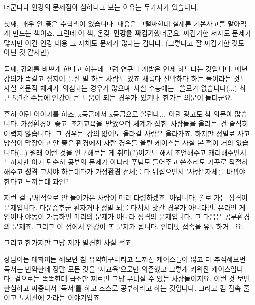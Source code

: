 더군다나 인강의 문제점이 심하다고 보는 이유는 두가지가 있습니다.
\vspace{5mm}

첫째, 매우 안 좋은 수학책이 있습니다.
내용은 그럴싸한데 실제론 기본사고를 말아먹게 만드는 책이죠.
그런데 이 책, 온갖 \textbf{인강을 짜깁기}했더군요. 짜깁기한 저자도 문제가 많지만 이건 인강 내용 그 자체도 문제가 많다는 겁니다.
(그렇다고 잘 짜깁기한 것도 아닌 것 같지만)
\vspace{5mm}

둘째, 강의를 바쁘게 한다고 하는데 그럼 연구나 개발은 언제 하느냐는 것입니다. 매년 강의가 똑같고 심지어 틀린 말 하는 사람도 있죠
새롭다 신박하다 하는 풀이라는 것도 사실 학문적 체계가 의심되는 경우가 많으며 사실 수능에는  쓸모가 없습니다(...)
최근 5년간 수능에 인강이 큰 도움이 되는 경우가 있기나 한가는 의문이 들더군요.
\vspace{5mm}

흔히 이런 이야기를 하죠. x등급에서 x등급으로 올린다... 이런 광고도 참 의문이 많습니다.
가정환경이 좋고 조기교육을 받았으며 체계가 잡힌 사람들을 올리는 건 솔직히 어렵지 않습니다. 그 경우는 강의 없어도 올라갈 사람은 올라가죠.
하지만 정말로 사고방식이 막장이고 안 좋은 환경에서 자란 경우를 올린 케이스는 사실 본 적이 거의 없습니다(...)
원래 이런 것을 연구해보는 게 취미(?)이기도 해서 조언해주고 캐리해주면서 느끼지만
이거 단순히 공부의 문제가 아니라 푸념도 들어주고 쓴소리도 거꾸로 적절히 해주고 \textbf{성격} 고쳐야 하는데다가
가정\textbf{환경} 전체를 다 뒤집으면서 '사람' 자체를 바꿔야한다고 느끼는데 과연?
\vspace{5mm}

저런 걸 구체적으로 안 들어가본 사람이 머리 타령하겠죠. 아닙니다, 뭘로 가든 성격이 문제입니다.
다운증후군 환자거나 정말 뇌를 다쳐서 맛간 경우가 아니라면, 온라인 게임이나 야동이 가능하면 머리의 문제가 아니라 성격의 문제입니다.
그 다음은 공부환경의 문제죠. 그리고 이 점에서 인강이 또 문제가 됩니다. 인터넷 접속을 유도하거든요.
\vspace{5mm}

그리고 한가지만 그냥 제가 발견한 사실 적죠.
\vspace{5mm}

상담이든 대화이든 해보면 참 유약하구나라고 느껴진 케이스들이 많고 다 추적해보면
독서는 빈약한데 정말 모든 것을 '사교육'으로만 의존했고 그렇게 키워진 케이스입니다.
겉으로는 똑똑한데 급소만 찌르면 그냥 무너질 수 있는 사람들이지요.
이런 것 보면 한심하고 짜증나서 '독서'를 하고 스스로 공부하라고 하는 것입니다.
그리고 컴 접속 줄이고 도서관에 가라는 이야기입죠
\vspace{5mm}

